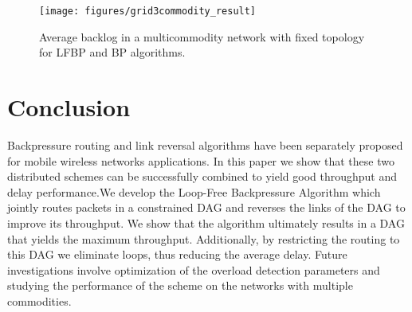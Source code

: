 \documentclass{sig-alternate-2013}
\begin{document}
\begin{figure}[h!]
\centering
\texttt{[image: figures/grid3commodity\_result]}
\caption{Average backlog in a multicommodity network with fixed topology for LFBP and BP algorithms.}
\label{3commodity_plot}
\end{figure}


\section{Conclusion}
Backpressure routing and link reversal algorithms have been separately proposed for mobile wireless networks applications. In this paper we show that these two distributed schemes can be successfully combined to yield good throughput and delay performance.We develop the Loop-Free Backpressure Algorithm which jointly routes packets in a constrained DAG and reverses the links of the DAG to improve its throughput. We show that the algorithm ultimately results in  a DAG that yields the maximum throughput. Additionally, by restricting the routing to this DAG we eliminate loops, thus reducing the average delay. 
Future investigations involve optimization of the overload detection parameters  and studying the performance of the scheme on the networks with  multiple commodities.
\end{document}
